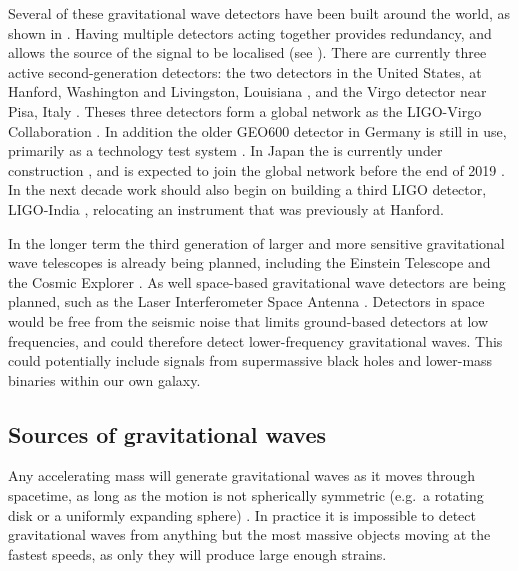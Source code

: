 \begin{colsection}
\begin{colsection}
\newpage

Several of these gravitational wave detectors have been built around the world, as shown in . Having multiple detectors acting together provides redundancy, and allows the source of the signal to be localised (see ). There are currently three active second-generation detectors: the two  detectors in the United States, at Hanford, Washington and Livingston, Louisiana \citep{LIGO}, and the  Virgo detector near Pisa, Italy \citep{Virgo}. Theses three detectors form a global network as the LIGO-Virgo Collaboration  \citep[LVC,][]{LIGO-Virgo}. In addition the older GEO600 detector in Germany is still in use, primarily as a technology test system \citep{GEO600}. In Japan the  is currently under construction \citep{KAGRA}, and is expected to join the global network before the end of 2019 \citep{LIGO-Virgo-KAGRA}. In the next decade work should also begin on building a third LIGO detector, LIGO-India \citep{LIGO_India}, relocating an instrument that was previously at Hanford.

In the longer term the third generation of larger and more sensitive gravitational wave telescopes is already being planned, including the Einstein Telescope \citep{EinsteinTelescope} and the Cosmic Explorer \citep{CosmicExplorer}. As well space-based gravitational wave detectors are being planned, such as the Laser Interferometer Space Antenna  \citep[LISA,][]{LISA}. Detectors in space would be free from the seismic noise that limits ground-based detectors at low frequencies, and could therefore detect lower-frequency gravitational waves. This could potentially include signals from supermassive black holes and lower-mass binaries within our own galaxy.

\end{colsection}


\subsection{Sources of gravitational waves}
\label{sec:gw_sources}
\begin{colsection}

Any accelerating mass will generate gravitational waves as it moves through spacetime, as long as the motion is not spherically symmetric (e.g.\ a rotating disk or a uniformly expanding sphere) \citep{BIGcardiff,BIGparis}. In practice it is impossible to detect gravitational waves from anything but the most massive objects moving at the fastest speeds, as only they will produce large enough strains.


\end{colsection}
\end{colsection}

